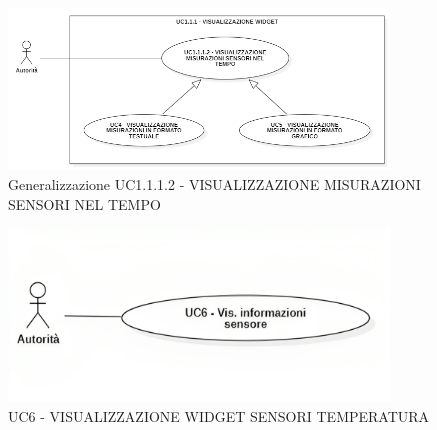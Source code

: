 



\begin{figure}[H]
    \centering
    \includegraphics[width=0.9\textwidth]{../Images/uc1.1.1.2Gen.PNG}
    \caption{Generalizzazione UC1.1.1.2 - VISUALIZZAZIONE MISURAZIONI SENSORI NEL TEMPO}
    \label{fig:UC3_gen}
\end{figure}






\begin{figure}[H]
    \centering
    \includegraphics[width=0.9\textwidth]{../Images/uc6.png}
    \caption{UC6 - VISUALIZZAZIONE WIDGET SENSORI TEMPERATURA}
    \label{fig:UC6}
\end{figure}


